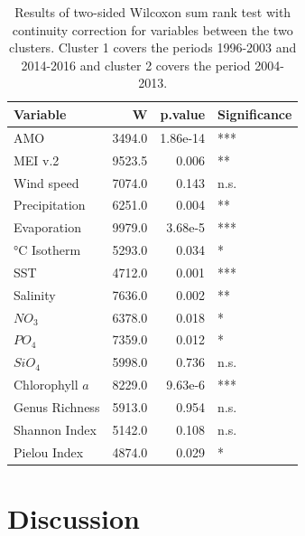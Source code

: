 \documentclass[draft]{agujournal2019}
\begin{document}
\begin{table}
\caption{Results of two-sided Wilcoxon sum rank test with continuity correction for variables between the two clusters. Cluster 1 covers the periods 1996-2003 and 2014-2016 and cluster 2 covers the period 2004-2013.}
\centering
\begin{tabular}[t]{lrrl}
\toprule
Variable & W & p.value & Significance\\
\midrule
AMO & 3494.0 & 1.86e-14 & ***\\
MEI v.2 & 9523.5 & 0.006 & **\\
Wind speed & 7074.0 & 0.143 & n.s.\\
Precipitation & 6251.0 & 0.004 & **\\
Evaporation & 9979.0 & 3.68e-5 & ***\\
\addlinespace
21 °C Isotherm & 5293.0 & 0.034 & *\\
SST & 4712.0 & 0.001 & ***\\
Salinity & 7636.0 & 0.002 & **\\
$NO_3$ & 6378.0 & 0.018 & *\\
$PO_4$ & 7359.0 & 0.012 & *\\
$SiO_4$ & 5998.0 & 0.736 & n.s.\\
\addlinespace
Chlorophyll $a$ & 8229.0 & 9.63e-6 & ***\\
Genus Richness & 5913.0 & 0.954 & n.s.\\
Shannon Index & 5142.0 & 0.108 & n.s.\\
Pielou Index & 4874.0 & 0.029 & *\\
\bottomrule
\end{tabular}
\end{table}



\section{Discussion}
\end{document}
